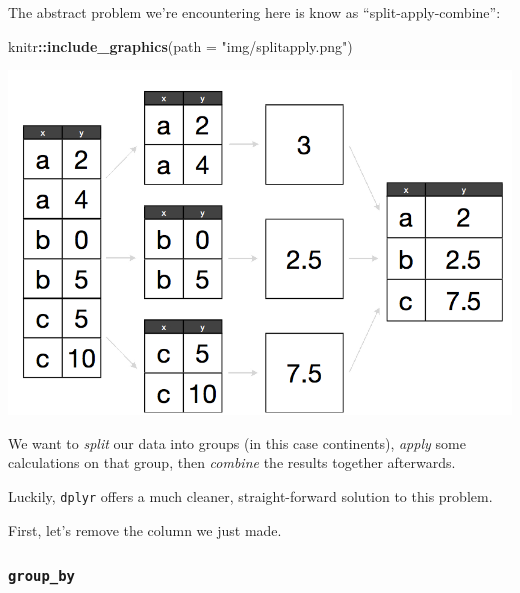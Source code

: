 \documentclass[]{book}
\newenvironment{Shaded}{\begin{snugshade}}{\end{snugshade}}
\newcommand{\CommentTok}[1]{\textcolor[rgb]{0.56,0.35,0.01}{\textit{#1}}}
\newcommand{\DataTypeTok}[1]{\textcolor[rgb]{0.13,0.29,0.53}{#1}}
\newcommand{\KeywordTok}[1]{\textcolor[rgb]{0.13,0.29,0.53}{\textbf{#1}}}
\newcommand{\NormalTok}[1]{#1}
\newcommand{\OperatorTok}[1]{\textcolor[rgb]{0.81,0.36,0.00}{\textbf{#1}}}
\newcommand{\OtherTok}[1]{\textcolor[rgb]{0.56,0.35,0.01}{#1}}
\newcommand{\StringTok}[1]{\textcolor[rgb]{0.31,0.60,0.02}{#1}}
\begin{document}
The abstract problem we're encountering here is know as ``split-apply-combine'':

\begin{Shaded}
\begin{Highlighting}[]
\NormalTok{knitr}\OperatorTok{::}\KeywordTok{include_graphics}\NormalTok{(}\DataTypeTok{path =} \StringTok{"img/splitapply.png"}\NormalTok{)}
\end{Highlighting}
\end{Shaded}

\begin{center}\includegraphics[width=0.7\linewidth]{img/splitapply} \end{center}

We want to \emph{split} our data into groups (in this case continents), \emph{apply} some calculations on that group, then \emph{combine} the results together afterwards.

Luckily, \texttt{dplyr} offers a much cleaner, straight-forward solution to this problem.

First, let's remove the column we just made.

\begin{Shaded}
\end{Shaded}

\hypertarget{group_by}{%
\subsubsection{\texorpdfstring{\texttt{group\_by}}{group\_by}}\label{group_by}}
\end{document}
